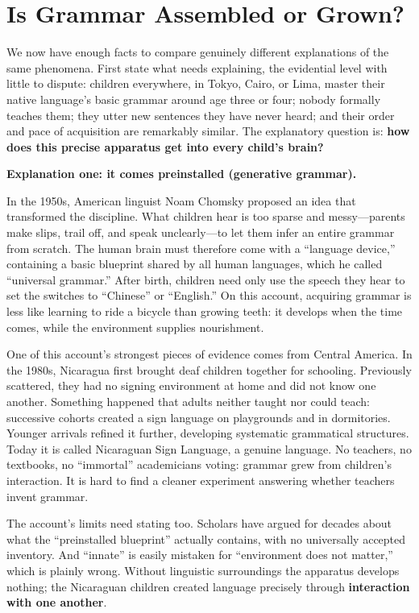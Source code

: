 \section{Is Grammar Assembled or Grown?}
We now have enough facts to compare genuinely different explanations of the same phenomena. First state what needs explaining, the evidential level with little to dispute: children everywhere, in Tokyo, Cairo, or Lima, master their native language's basic grammar around age three or four; nobody formally teaches them; they utter new sentences they have never heard; and their order and pace of acquisition are remarkably similar. The explanatory question is: \textbf{how does this precise apparatus get into every child's brain?}

\textbf{Explanation one: it comes preinstalled (generative grammar).}

In the 1950s, American linguist Noam Chomsky proposed an idea that transformed the discipline. What children hear is too sparse and messy---parents make slips, trail off, and speak unclearly---to let them infer an entire grammar from scratch. The human brain must therefore come with a ``language device,'' containing a basic blueprint shared by all human languages, which he called ``universal grammar.'' After birth, children need only use the speech they hear to set the switches to ``Chinese'' or ``English.'' On this account, acquiring grammar is less like learning to ride a bicycle than growing teeth: it develops when the time comes, while the environment supplies nourishment.

One of this account's strongest pieces of evidence comes from Central America. In the 1980s, Nicaragua first brought deaf children together for schooling. Previously scattered, they had no signing environment at home and did not know one another. Something happened that adults neither taught nor could teach: successive cohorts created a sign language on playgrounds and in dormitories. Younger arrivals refined it further, developing systematic grammatical structures. Today it is called Nicaraguan Sign Language, a genuine language. No teachers, no textbooks, no ``immortal'' academicians voting: grammar grew from children's interaction. It is hard to find a cleaner experiment answering whether teachers invent grammar.

The account's limits need stating too. Scholars have argued for decades about what the ``preinstalled blueprint'' actually contains, with no universally accepted inventory. And ``innate'' is easily mistaken for ``environment does not matter,'' which is plainly wrong. Without linguistic surroundings the apparatus develops nothing; the Nicaraguan children created language precisely through \textbf{interaction with one another}.

